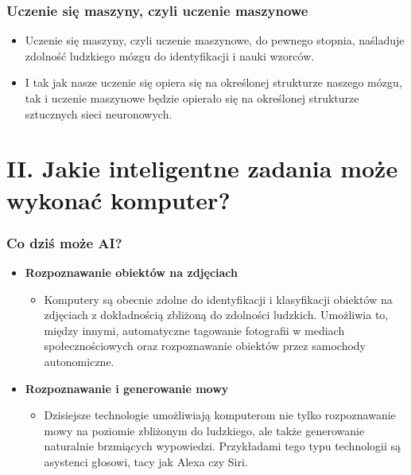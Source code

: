\documentclass{beamer}
\begin{document}
\begin{frame}[fragile]
\frametitle{Uczenie się maszyny, czyli uczenie maszynowe}
\begin{itemize}
\item Uczenie się maszyny, czyli uczenie maszynowe, do pewnego stopnia, naśladuje zdolność ludzkiego mózgu do identyfikacji i nauki wzorców.
\item I tak jak nasze uczenie się opiera się na określonej strukturze naszego mózgu, tak i uczenie maszynowe będzie opierało się na określonej strukturze sztucznych sieci neuronowych. 
\end{itemize}

\end{frame}

\section{II. Jakie inteligentne zadania może wykonać komputer?}

\begin{frame}[fragile]
\frametitle{Co dziś może AI?}
 \begin{itemize}
\item \textbf{Rozpoznawanie obiektów na zdjęciach}
	\begin{itemize}
	\item Komputery są obecnie zdolne do identyfikacji i klasyfikacji obiektów na zdjęciach z dokładnością zbliżoną do zdolności ludzkich. Umożliwia to, między innymi, automatyczne tagowanie fotografii w mediach społecznościowych oraz rozpoznawanie obiektów przez samochody autonomiczne.
	\end{itemize}
\item \textbf{Rozpoznawanie i generowanie mowy} 
	\begin{itemize}
	\item Dzisiejsze technologie umożliwiają komputerom nie tylko rozpoznawanie mowy na poziomie zbliżonym do ludzkiego, ale także generowanie naturalnie brzmiących wypowiedzi. Przykładami tego typu technologii są asystenci głosowi, tacy jak Alexa czy Siri.
	\end{itemize}
\end{itemize}
\end{frame}
\end{document}
